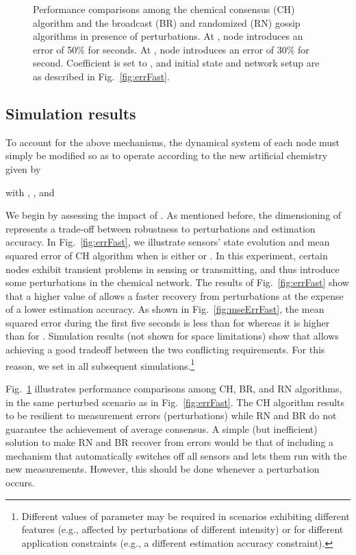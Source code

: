 \documentclass[journal]{IEEEtran}
\begin{document}
\begin{figure}[t]
 \centering
\caption{{Performance comparisons among the chemical consensus (CH) algorithm and the broadcast (BR) and randomized (RN) gossip algorithms in presence of perturbations. At , node  introduces an error of 50\% for  seconds. At , node  introduces an error of 30\% for  second. Coefficient  is set to , and initial state and network setup are as described in Fig.~\ref{fig:errFast}. }}
\label{fig:errComp}
\end{figure}

\subsection{Simulation results}

{To account for the above mechanisms, the dynamical system of each node must simply be modified so as to operate according to the new artificial chemistry given by 

with , ,  and 
} 
{We begin by assessing the impact of . As mentioned before, the dimensioning of  represents a trade-off between robustness to perturbations and estimation accuracy. In Fig.~\ref{fig:errFast}, we illustrate sensors' state evolution and mean squared error of CH algorithm when  is either  or . 
In this experiment, certain nodes exhibit transient problems in sensing or transmitting, and thus introduce some perturbations in the chemical network.
The results of Fig.~\ref{fig:errFast} show that a higher value of  allows a faster recovery from perturbations at the expense of a lower estimation accuracy. {As shown in Fig.~\ref{fig:mseErrFast}, the mean squared error during the first five seconds is less than  for  whereas it is higher than  for }. Simulation results (not shown for space limitations) show that  allows achieving a good tradeoff between the two conflicting requirements. For this reason, we set  in all subsequent simulations.\footnote{{Different values of parameter  may be required in scenarios exhibiting different features (e.g., affected by perturbations of different intensity) or for different application constraints (e.g., a different estimation accuracy constraint).}}
} 

{Fig.~\ref{fig:errComp} illustrates performance comparisons among CH, BR, and RN algorithms, in the same perturbed scenario as in Fig.~\ref{fig:errFast}. The CH algorithm results to be resilient to measurement errors (perturbations) while RN and BR do not guarantee the achievement of average consensus. A simple (but inefficient) solution to make RN and BR recover from errors would be that of including a mechanism that automatically switches off all sensors and lets them run with the new measurements. However, this should be done whenever a perturbation occurs.}
\end{document}
